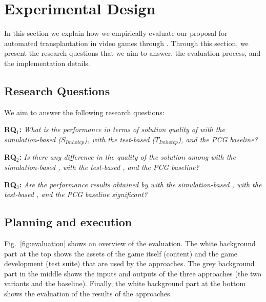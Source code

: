 \section{Experimental Design} 
\label{sec:Evaluation}

In this section we explain how we empirically evaluate our proposal for automated transplantation in video games through \ApproachName{}. Through this section, we present the research questions that we aim to answer, the evaluation process, and the implementation details.

\subsection{Research Questions}

We aim to answer the following research questions:

\textbf{RQ$_1$: }\textit{What is the performance in terms of solution quality of \ApproachName{} with the simulation-based \ApproachName{} ($S_{Imhotep}$), \ApproachName{} with the test-based \ApproachName{} ($T_{Imhotep}$), and the PCG baseline?}

\textbf{RQ$_2$: }\textit{Is there any difference in the quality of the solution among \ApproachName{} with the simulation-based \ApproachName{}, \ApproachName{} with the test-based \ApproachName{}, and the PCG baseline?}

\textbf{RQ$_3$: }\textit{Are the performance results obtained by \ApproachName{} with the simulation-based \ApproachName{}, \ApproachName{} with the test-based \ApproachName{}, and the PCG baseline significant?}


\subsection{Planning and execution}

Fig.~\ref{fig:evaluation} shows an overview of the evaluation. The white background part at the top shows the assets of the game itself (content) and the game development (test suite) that are used by the approaches. The grey background part in the middle shows the inputs and outputs of the three approaches (the two \ApproachName{} variants and the baseline). Finally, the white background part at the bottom shows the evaluation of the results of the approaches.

